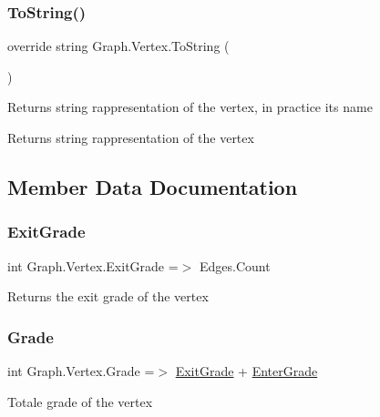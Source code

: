 \subsubsection{\texorpdfstring{To\+String()}{ToString()}}
{\footnotesize\ttfamily override string Graph.\+Vertex.\+To\+String (\begin{DoxyParamCaption}{ }\end{DoxyParamCaption})}



Returns string rappresentation of the vertex, in practice its name 

\begin{DoxyReturn}{Returns}
string rappresentation of the vertex
\end{DoxyReturn}


\subsection{Member Data Documentation}
\mbox{\label{class_graph_1_1_vertex_ab165fd05985d7ab12341f97abcde9e79}} 
\subsubsection{\texorpdfstring{Exit\+Grade}{ExitGrade}}
{\footnotesize\ttfamily int Graph.\+Vertex.\+Exit\+Grade =$>$ Edges.\+Count}



Returns the exit grade of the vertex 

\mbox{\label{class_graph_1_1_vertex_a120c6d309edf2487e4d7d8463f586dc4}} 
\subsubsection{\texorpdfstring{Grade}{Grade}}
{\footnotesize\ttfamily int Graph.\+Vertex.\+Grade =$>$ \hyperlink{class_graph_1_1_vertex_ab165fd05985d7ab12341f97abcde9e79}{Exit\+Grade} + \hyperlink{class_graph_1_1_vertex_a63c478ac5624dcd7d424212e1b4fa923}{Enter\+Grade}}



Totale grade of the vertex 



